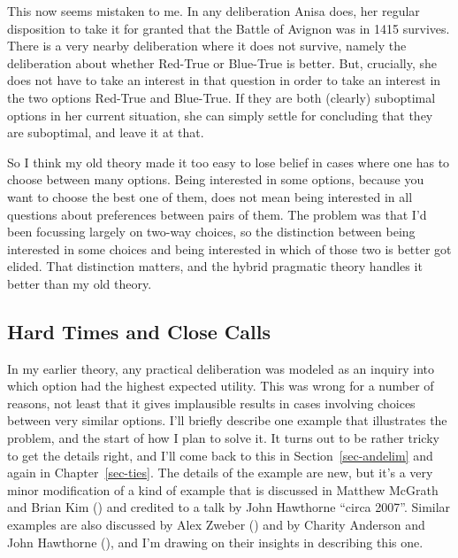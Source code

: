\documentclass[
  10pt,
  letterpaper,
  twoside]{scrbook}
\begin{document}
This now seems mistaken to me. In any deliberation Anisa does, her
regular disposition to take it for granted that the Battle of Avignon
was in 1415 survives. There is a very nearby deliberation where it does
not survive, namely the deliberation about whether Red-True or Blue-True
is better. But, crucially, she does not have to take an interest in that
question in order to take an interest in the two options Red-True and
Blue-True. If they are both (clearly) suboptimal options in her current
situation, she can simply settle for concluding that they are
suboptimal, and leave it at that.

So I think my old theory made it too easy to lose belief in cases where
one has to choose between many options. Being interested in some
options, because you want to choose the best one of them, does not mean
being interested in all questions about preferences between pairs of
them. The problem was that I'd been focussing largely on two-way
choices, so the distinction between being interested in some choices and
being interested in which of those two is better got elided. That
distinction matters, and the hybrid pragmatic theory handles it better
than my old theory.

\subsection{Hard Times and Close Calls}\label{sec-meties}

In my earlier theory, any practical deliberation was modeled as an
inquiry into which option had the highest expected utility. This was
wrong for a number of reasons, not least that it gives implausible
results in cases involving choices between very similar options. I'll
briefly describe one example that illustrates the problem, and the start
of how I plan to solve it. It turns out to be rather tricky to get the
details right, and I'll come back to this in Section~\ref{sec-andelim}
and again in Chapter~\ref{sec-ties}. The details of the example are new,
but it's a very minor modification of a kind of example that is
discussed in Matthew McGrath and Brian Kim
() and credited to a talk by John
Hawthorne ``circa 2007''. Similar examples are also discussed by Alex
Zweber () and by Charity Anderson and
John Hawthorne (), and I'm
drawing on their insights in describing this one.
\end{document}
